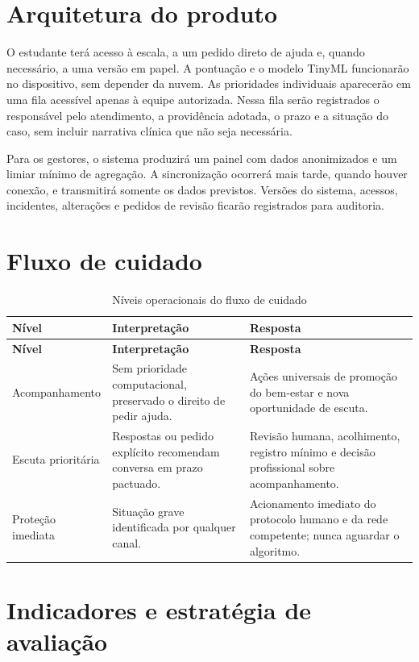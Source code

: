 \documentclass[
  12pt,
  openright,
  oneside,
  a4paper,
  english,
  brazil
]{abntex2}
\begin{document}
\section{Arquitetura do produto}

O estudante terá acesso à escala, a um pedido direto de ajuda e, quando
necessário, a uma versão em papel. A pontuação e o modelo TinyML funcionarão no
dispositivo, sem depender da nuvem. As prioridades individuais aparecerão em
uma fila acessível apenas à equipe autorizada. Nessa fila serão registrados o
responsável pelo atendimento, a providência adotada, o prazo e a situação do
caso, sem incluir narrativa clínica que não seja necessária.

Para os gestores, o sistema produzirá um painel com dados anonimizados e um
limiar mínimo de agregação. A sincronização ocorrerá mais tarde, quando houver
conexão, e transmitirá somente os dados previstos. Versões do sistema, acessos,
incidentes, alterações e pedidos de revisão ficarão registrados para auditoria.

\section{Fluxo de cuidado}

\begin{longtable}{p{2.8cm}p{4cm}p{5.5cm}}
\caption{Níveis operacionais do fluxo de cuidado}\label{tab:fluxo}\\
\toprule
\textbf{Nível} & \textbf{Interpretação} & \textbf{Resposta} \\
\midrule
\endfirsthead
\toprule
\textbf{Nível} & \textbf{Interpretação} & \textbf{Resposta} \\
\midrule
\endhead
Acompanhamento & Sem prioridade computacional, preservado o direito de pedir ajuda. & Ações universais de promoção do bem-estar e nova oportunidade de escuta. \\
\addlinespace
Escuta prioritária & Respostas ou pedido explícito recomendam conversa em prazo pactuado. & Revisão humana, acolhimento, registro mínimo e decisão profissional sobre acompanhamento. \\
\addlinespace
Proteção imediata & Situação grave identificada por qualquer canal. & Acionamento imediato do protocolo humano e da rede competente; nunca aguardar o algoritmo. \\
\bottomrule
\end{longtable}

\section{Indicadores e estratégia de avaliação}
\end{document}
